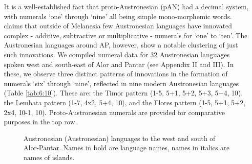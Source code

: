 It is a well-established fact that proto-Austronesian (pAN) had a decimal system, with numerals `one' through `nine' all being simple mono-morphemic words. \citet[268]{Blust2009} claims that outside of Melanesia few Austronesian languages have innovated complex - additive, subtractive or multiplicative - numerals for `one' to `ten'. The Austronesian languages around AP, however, show a notable clustering of just such innovations. We compiled numeral data for 32 Austronesian languages spoken west and south-east of Alor and Pantar (see Appendix II and III). In these, we observe three distinct patterns of innovations in the formation of numerals `six' through `nine', reflected in nine modern Austronesian languages (Table \ref{tab:6:10}). These are: the Timor pattern (1-5, 5+1, 5+2, 5+3, 5+4, 10), the Lembata pattern (1-7, 4x2, 5+4, 10), and the Flores pattern (1-5, 5+1, 5+2, 2x4, 10-1, 10). Proto-Austronesian numerals are provided for comparative purposes in the top row. 

\begin{figure}
\caption{Austronesian (Austronesian) languages to the west and south of Alor{}-Pantar. Names in bold are language names, names in italics are names of islands.}
\label{fig:6:1}
\end{figure}
 

